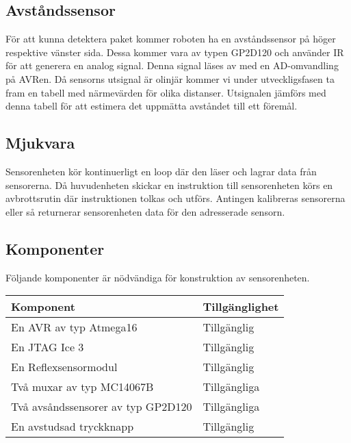 \subsection{Avståndssensor}
För att kunna detektera paket kommer roboten ha en avståndssensor på höger respektive vänster sida. Dessa kommer vara av typen GP2D120 och använder IR för att generera en analog signal. Denna signal läses av med en AD-omvandling på AVRen. Då sensorns utsignal är olinjär kommer vi under utveckligsfasen ta fram en tabell med närmevärden för olika distanser. Utsignalen jämförs med denna tabell för att estimera det uppmätta avståndet till ett föremål.

\subsection{Mjukvara}
Sensorenheten kör kontinuerligt en loop där den läser och lagrar data från sensorerna. Då huvudenheten skickar en instruktion till sensorenheten körs en avbrottsrutin där instruktionen tolkas och utförs. Antingen kalibreras sensorerna eller så returnerar sensorenheten data för den adresserade sensorn.




%

\subsection{Komponenter}
Följande komponenter är nödvändiga för konstruktion av sensorenheten. \\

\begin{tabularx}{\textwidth}{| l | X |}
	\hline
	{\textbf{Komponent}} & {\textbf{Tillgänglighet}} \\\hline
	{En AVR av typ Atmega16} & {Tillgänglig} \\\hline
	{En JTAG Ice 3} & {Tillgänglig} \\\hline
	{En Reflexsensormodul} & {Tillgänglig} \\\hline
	{Två muxar av typ MC14067B} & {Tillgängliga} \\\hline
	{Två avsåndssensorer av typ GP2D120} & {Tillgängliga} \\\hline
	{En avstudsad tryckknapp} & {Tillgänglig} \\\hline
\end{tabularx}